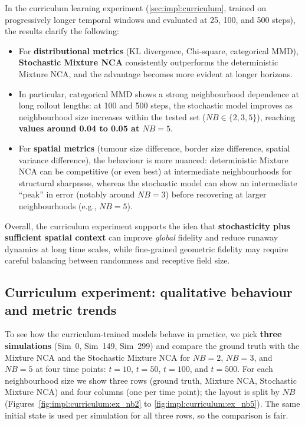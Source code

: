 In the curriculum learning experiment (\cref{sec:impl:curriculum}, trained on progressively longer temporal windows and evaluated at 25, 100, and 500 steps), the results clarify the following:
\begin{itemize}
\item For \textbf{distributional metrics} (KL divergence, Chi-square, categorical MMD), \textbf{Stochastic Mixture NCA} consistently outperforms the deterministic Mixture NCA, and the advantage becomes more evident at longer horizons.
\item In particular, categorical MMD shows a strong neighbourhood dependence at long rollout lengths: at 100 and 500 steps, the stochastic model improves as neighbourhood size increases within the tested set (\(NB\in\{2,3,5\}\)), reaching \textbf{values around 0.04 to 0.05 at \(NB=5\)}.
\item For \textbf{spatial metrics} (tumour size difference, border size difference, spatial variance difference), the behaviour is more nuanced: deterministic Mixture NCA can be competitive (or even best) at intermediate neighbourhoods for structural sharpness, whereas the stochastic model can show an intermediate ``peak'' in error (notably around \(NB=3\)) before recovering at larger neighbourhoods (e.g., \(NB=5\)).
\end{itemize}

Overall, the curriculum experiment supports the idea that \textbf{stochasticity plus sufficient spatial context} can improve \emph{global} fidelity and reduce runaway dynamics at long time scales, while fine-grained geometric fidelity may require careful balancing between randomness and receptive field size.

\subsection{Curriculum experiment: qualitative behaviour and metric trends}
\label{sec:results:curriculum}

To see how the curriculum-trained models behave in practice, we pick \textbf{three simulations} (Sim~0, Sim~149, Sim~299) and compare the ground truth with the Mixture NCA and the Stochastic Mixture NCA for \(NB=2\), \(NB=3\), and \(NB=5\) at four time points: \(t=10\), \(t=50\), \(t=100\), and \(t=500\).
For each neighbourhood size we show three rows (ground truth, Mixture NCA, Stochastic Mixture NCA) and four columns (one per time point); the layout is split by \(NB\) (Figures~\ref{fig:impl:curriculum:ex_nb2} to \ref{fig:impl:curriculum:ex_nb5}).
The same initial state is used per simulation for all three rows, so the comparison is fair.

